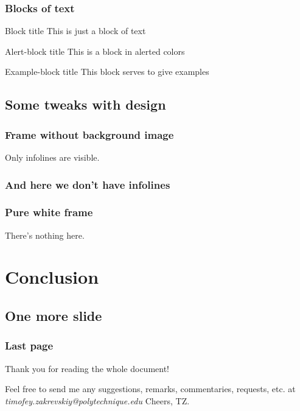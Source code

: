 \documentclass{beamer}
\begin{document}
\begin{frame}
\frametitle{Blocks of text}
\begin{block}{Block title}
This is just a block of text
\end{block}

\begin{alertblock}{Alert-block title}
This is a block in alerted colors
\end{alertblock}

\begin{exampleblock}{Example-block title}
This block serves to give examples
\end{exampleblock}
\end{frame}

\subsection{Some tweaks with design}
{ %
\begin{frame}
\frametitle{Frame without background image}


Only infolines are visible.
\end{frame}
}

{%
\begin{frame}
\frametitle{And here we don't have infolines}
\end{frame}
}

{%
\begin{frame}
\frametitle{Pure white frame}

There's nothing here.

\end{frame}
}

\section{Conclusion}
\subsection{One more slide}
\begin{frame}
\frametitle{Last page}
Thank you for reading the whole document!

Feel free to send me any suggestions, remarks, commentaries, requests, etc. at \textit{{\color{Xblue}timofey.zakrevskiy@polytechnique.edu}}
\vfill
Cheers, TZ.
\end{frame}
\end{document}

